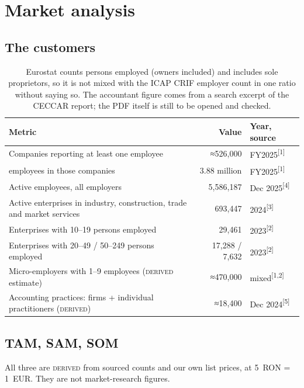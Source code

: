 \documentclass[10pt,a4paper]{article}
\newcommand{\src}[1]{\textsuperscript{\textcolor{brandSlate}{[#1]}}}
\begin{document}
\section{Market analysis}

\subsection{The customers}

\begin{table}[H]
\centering\small
\begin{tabularx}{\linewidth}{@{}Lrl@{}}
\toprule
\textbf{Metric} & \textbf{Value} & \textbf{Year, source} \\
\midrule
Companies reporting at least one employee & ≈526,000 & FY2025\src{1} \\
\quad employees in those companies & 3.88 million & FY2025\src{1} \\
Active employees, all employers & 5,586,187 & Dec 2025\src{4} \\
Active enterprises in industry, construction, trade and market services & 693,447 & 2024\src{3} \\
Enterprises with 10--19 persons employed & 29,461 & 2023\src{2} \\
Enterprises with 20--49 / 50--249 persons employed & 17,288 / 7,632 & 2023\src{2} \\
Micro-employers with 1--9 employees (\textsc{derived} estimate) & ≈470,000 & mixed\src{1,2} \\
Accounting practices: firms + individual practitioners (\textsc{derived}) & ≈18,400 & Dec 2024\src{5} \\
\bottomrule
\end{tabularx}
\caption*{\footnotesize\color{brandSlate}Eurostat counts persons employed (owners included) and
includes sole proprietors, so it is not mixed with the ICAP CRIF employer count in one ratio
without saying so. The accountant figure comes from a search excerpt of the CECCAR report; the PDF
itself is still to be opened and checked.}
\end{table}

\subsection{TAM, SAM, SOM}

All three are \textsc{derived} from sourced counts and our own list prices, at 5~RON = 1~EUR.
They are not market-research figures.
\end{document}
